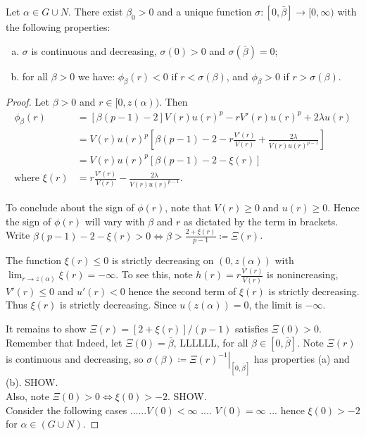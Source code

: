 \newpage
\begin{lemma}Let $\alpha\in G\cup N$. There exist $\beta_0>0$ and a unique function $\sigma:[0,\bar\beta]\to[0,\infty)$ with the following properties: \begin{enumerate}[(a)]
	\item  $\sigma$ is continuous and decreasing, $\sigma(0)>0$ and $\sigma(\bar\beta)=0$;
    \item for all $\beta>0$ we have: $\phi_\beta(r)<0$ if $r<\sigma(\beta)$, and $\phi_\beta>0$ if $r>\sigma(\beta)$.
\end{enumerate}
\begin{proof} 
Let $\beta>0$ and $r\in[0,z(\alpha))$. Then \begin{align*}
\phi_{\beta}(r)&=\left[\beta(p-1)-2\right]V(r)u(r)^p-rV'(r)u(r)^p+2\lambda u(r) %
\\ &=V(r)u(r)^p\left[\beta(p-1)-2-r\frac{V'(r)}{V(r)}+\frac{2\lambda}{V(r)u(r)^{p-1}}\right] 
\\ &= V(r)u(r)^p\left[\beta(p-1)-2-\xi(r)\right]
\\\text{where }\xi(r)&=r\frac{V'(r)}{V(r)}-\frac{2\lambda}{V(r)u(r)^{p-1}}.
\end{align*}

To conclude about the sign of $\phi(r)$, note that $V(r)\geq0$ and $u(r)\geq0$. Hence the sign of $\phi(r)$ will vary with $\beta$ and $r$ as dictated by the term in brackets. Write $\beta(p-1)-2-\xi(r)>0\iff\beta>\frac{2+\xi(r)}{p-1}\coloneqq\Xi(r)$.

The function $\xi(r)\leq0$ is strictly decreasing on $(0,z(\alpha))$ with $\lim_{r\to z(\alpha)}\xi(r)=-\infty$. To see this, note $h(r)=r\frac{V'(r)}{V(r)}$ is nonincreasing, $V'(r)\leq0$ and $u'(r)<0$ hence the second term of $\xi(r)$ is strictly decreasing. Thus $\xi(r)$ is strictly decreasing. Since $u(z(\alpha))=0$, the limit is $-\infty$.

It remains to show $\Xi(r)=\left[2+\xi(r)\right]/(p-1)$ satisfies $\Xi(0)>0$. Remember that  Indeed, let $\Xi(0)=\bar\beta$, LLLLLL, for all $\beta\in[0,\bar\beta]$. Note $\Xi(r)$ is continuous and decreasing, so $\sigma(\beta)\coloneqq\left.\Xi(r)^{-1}\right|_{[0,\bar\beta]}$ has properties (a) and (b). SHOW. \\

Also, note $\Xi(0)>0\iff\xi(0)>-2$. SHOW.\\

Consider the following cases ......$V(0)<\infty$ .... $V(0)=\infty$ ... hence $\xi(0)>-2$ for $\alpha\in(G\cup N)$.

\end{proof}
\end{lemma}